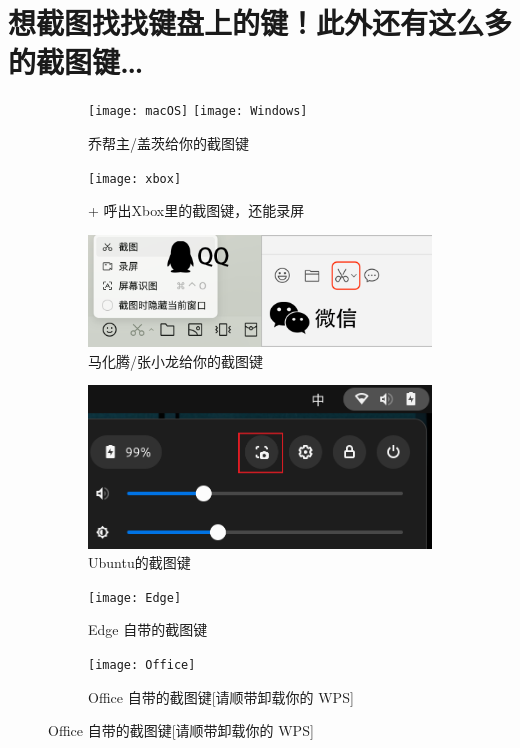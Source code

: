 \documentclass[11pt, fontset = fandol]{ctexart}
\begin{document}
\pagestyle{fancy} \let \headrule \relax \cfoot{} \lhead{} \rhead{}

\section*{想截图找找键盘上的键！此外还有这么多的截图键\ldots}

\begin{figure}[htbp]
  \begin{subfigure}{.48\linewidth}
    \centering
    \texttt{[image: macOS]}\hspace{-3.33pt}
    \texttt{[image: Windows]}
    \caption{乔帮主/盖茨给你的截图键}
  \end{subfigure}
  \hspace*{\fill}
  \begin{subfigure}{.48\linewidth}
    \centering
    \texttt{[image: xbox]}
    \caption{+ 呼出Xbox里的截图键，还能录屏}
  \end{subfigure}
  \begin{subfigure}{.48\linewidth}
    \centering
    \includegraphics[width = .96\linewidth]{Tencent}
    \caption{马化腾/张小龙给你的截图键}
  \end{subfigure}
  \hspace*{\fill}
  \begin{subfigure}{.48\linewidth}
    \centering
    \includegraphics[width = .96\linewidth]{Ubuntu}
    \caption{Ubuntu的截图键}
  \end{subfigure}
  \begin{subfigure}{.48\linewidth}
    \centering
    \texttt{[image: Edge]}
    \caption{Edge 自带的截图键}
  \end{subfigure}
  \hspace*{\fill}
  \begin{subfigure}{.48\linewidth}
    \centering
    \texttt{[image: Office]}
    \caption{Office 自带的截图键[请顺带卸载你的 WPS]}
  \end{subfigure}
\end{figure}
\end{document}
